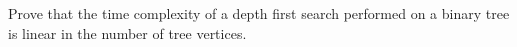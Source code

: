 Prove that the time complexity of a depth first search performed on a 
binary tree is linear in the number of tree vertices.
